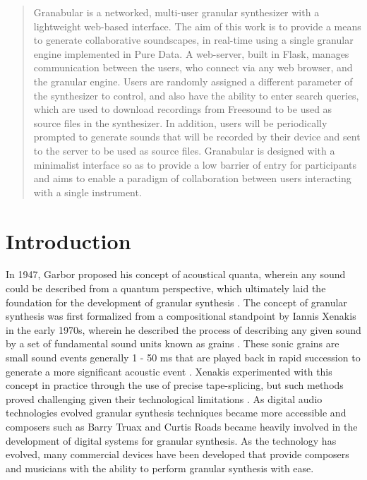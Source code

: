 \documentclass{nime-alternate}
\begin{document}
\begin{abstract}

Granabular is a networked, multi-user granular synthesizer with a lightweight web-based interface. 
The aim of this work is to provide a means to generate collaborative soundscapes, 
in real-time using a single granular engine implemented in Pure Data. A web-server, 
built in Flask, manages communication between the users, who connect via any web browser, and the granular engine. 
Users are randomly assigned a different parameter of the synthesizer to control, 
and also have the ability to enter search queries, which are used to download recordings 
from Freesound to be used as source files in the synthesizer. 
In addition, users will be periodically prompted to generate sounds that will be recorded 
by their device and sent to the server to be used as source files. Granabular is designed with a minimalist 
interface so as to provide a low barrier of entry for participants and aims to enable a paradigm of 
collaboration between users interacting with a single instrument. 

\end{abstract}


\section{Introduction}
In 1947, Garbor proposed his concept of acoustical quanta, wherein any sound could be described from a quantum perspective, 
which ultimately laid the foundation for the development of granular synthesis \cite{gabor1947acoustical}. 
The concept of granular synthesis was first formalized from a compositional standpoint by Iannis Xenakis in the early 1970s, 
wherein he described the process of describing any given sound by a set of fundamental sound units known as grains \cite{xenakis1992formalized}. 
These sonic grains are small sound events generally 1 - 50 ms that are played back in rapid succession to generate a more significant acoustic event \cite{roads1988granular}. 
Xenakis experimented with this concept in practice through the use of precise tape-splicing, 
but such methods proved challenging given their technological limitations \cite{roads1996computer}. 
As digital audio technologies evolved granular synthesis techniques became more accessible and composers 
such as Barry Truax \cite{truax1988real} and Curtis Roads \cite{roads1988granular} became heavily involved 
in the development of digital systems for granular synthesis. As the technology has evolved, 
many commercial devices have been developed that provide composers and musicians with the ability to perform granular synthesis with ease. 
\end{document}
